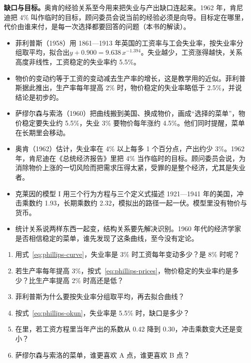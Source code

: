 \textbf{缺口与目标。}奥肯的经验关系至今用来把失业与产出缺口连起来。1962 年，肯尼迪把 4\% 叫作临时的目标，顾问委员会说当前的经验必须是向导\cite{erp1962}。目标定在哪里，代价由谁来付，是每一次选择都要回答的问题（本书的解读）。

\begin{takeaways}
\begin{itemize}
\item 菲利普斯（1958）用 1861—1913 年英国的工资率与工会失业率，按失业率分组取平均，拟合出$y+0.900=9.638\,x^{-1.394}$。失业越少，工资涨得越快，关系高度非线性，工资稳定的失业率约 5.5\%。
\item 物价的变动约等于工资的变动减去生产率的增长，这是教学用的近似。菲利普斯据此推出，生产率每年提高 2\% 时，物价稳定的失业率略低于 2.5\%，并说结论是初步的。
\item 萨缪尔森与索洛（1960）把曲线搬到美国、换成物价，画成“选择的菜单”，物价稳定要失业约 5.5\%，失业 3\% 要物价每年涨约 4.5\%。他们同时提醒，菜单在长期里会移动。
\item 奥肯（1962）估计，失业率在 4\% 以上每多 1 个百分点，产出约少 3\%。1962 年，肯尼迪在《总统经济报告》里把 4\% 当作临时的目标。顾问委员会说，为消除物价上涨的一切风险而把需求压得太紧，受罪的是整个经济，尤其是失业者。
\item 克莱因的模型 I 用三个行为方程与三个定义式描述 1921—1941 年的美国，冲击乘数约 1.93，长期乘数约 2.32，模拟出的路径一起一伏。模型里没有物价与货币。
\item 统计关系说两样东西一起变，结构关系要先解决识别。1960 年代的经济学家是否相信稳定的菜单，谁先发现了这条曲线，至今没有定论。
\end{itemize}
\end{takeaways}

\begin{selfcheck}
\begin{enumerate}
\item 用式~\eqref{eq:phillips-curve}，失业率是 3\% 时工资每年变动多少？是 8\% 时呢？
\item 若生产率每年提高 3\%，按式~\eqref{eq:phillips-prices}，物价稳定的失业率约是多少？比生产率提高 2\% 时高还是低？
\item 菲利普斯为什么要按失业率分组取平均，再去拟合曲线？
\item 按式~\eqref{eq:phillips-okun}，失业率是 5.5\% 时，缺口是多少？
\item 在里，若工资方程里当年产出的系数从 0.42 降到 0.30，冲击乘数变大还是变小？
\item 萨缪尔森与索洛的菜单，谁更喜欢 A 点，谁更喜欢 B 点？
\end{enumerate}
\end{selfcheck}

